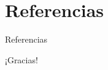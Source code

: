\section{Referencias}

\begin{frame}[allowframebreaks]{Referencias}
  \nocite{*}
  \printbibliography[heading=none]
\end{frame}

\begin{frame}[plain]
  \begin{center}
    {\Large\textcolor{morado}{¡Gracias!}}
  \end{center}
\end{frame}
